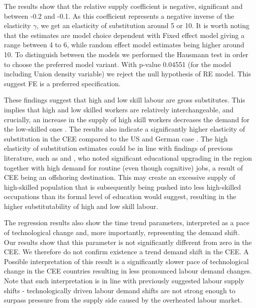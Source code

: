 \documentclass[11pt]{article}
\begin{document}
The results show that the relative supply coefficient is negative, significant and between -0.2 and -0.1. As this coefficient represents a negative inverse of the elasticity $\gamma$, we get an elasticity of substitution around 5 or 10.%
It is worth noting that the estimates are model choice dependent with Fixed effect model giving a range between 4 to 6, while random effect model estimates being higher around 10. To distinguish between the models we performed the Hausmann test in order to choose the preferred model variant. With p-value 0.04551 (for the model including Union density variable) we reject the null hypothesis of RE model. This suggest FE is a preferred specification. 

These findings suggest that high and low skill labour are gross substitutes. This implies that high and low skilled workers are relatively interchangeable, and crucially, an increase in the supply of high skill workers decreases the demand for the low-skilled ones \citep{havranek2020elasticity}. The results also indicate a significantly higher elasticity of substitution in the CEE compared to the US and German case \citep{acemoglu2012does, glitz2021skill}. The high elasticity of substitution estimates could be in line with findings of previous literature, such as \citet{arendt2019technical} and \citet{hardy2018educational}, who noted significant educational upgrading in the region together with high demand for routine (even though cognitive) jobs, a result of CEE being an offshoring destination. This may create an excessive supply of high-skilled population that is subsequently being pushed into less high-skilled occupations than its formal level of education would suggest, resulting in the higher substitutability of high and low skill labour.

The regression results also show the time trend parameters, interpreted as a pace of technological change and, more importantly, representing the demand shift. Our results show that this parameter is not significantly different from zero in the CEE. We therefore do not confirm existence a trend demand shift in the CEE. A Possible interpretation of this result is a significantly slower pace of technological change in the CEE countries resulting in less pronounced labour demand changes. Note that such interpretation is in line with previously suggested labour supply shifts - technologically driven labour demand shifts are not strong enough to surpass pressure from the supply side caused by the overheated labour market.
\end{document}
